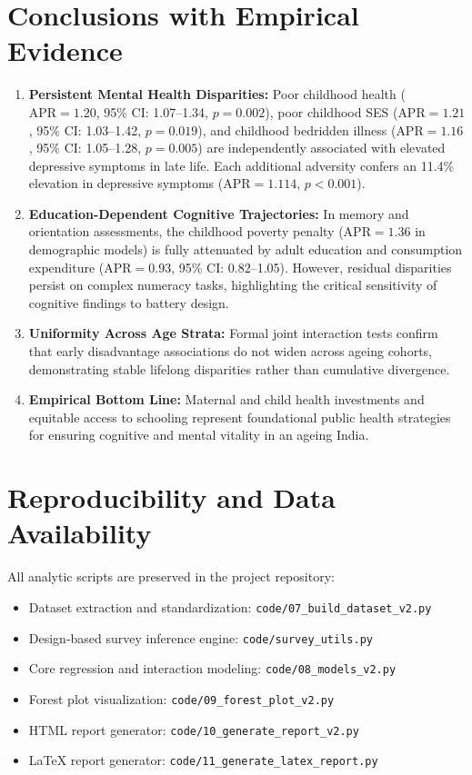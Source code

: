 \documentclass[11pt,a4paper]{article}
\begin{document}
\section{Conclusions with Empirical Evidence}
\begin{enumerate}
    \item \textbf{Persistent Mental Health Disparities:} Poor childhood health ($\text{APR} = 1.20$, 95\% CI: 1.07--1.34, $p = 0.002$), poor childhood SES ($\text{APR} = 1.21$, 95\% CI: 1.03--1.42, $p = 0.019$), and childhood bedridden illness ($\text{APR} = 1.16$, 95\% CI: 1.05--1.28, $p = 0.005$) are independently associated with elevated depressive symptoms in late life. Each additional adversity confers an 11.4\% elevation in depressive symptoms ($\text{APR} = 1.114$, $p < 0.001$).
    \item \textbf{Education-Dependent Cognitive Trajectories:} In memory and orientation assessments, the childhood poverty penalty ($\text{APR} = 1.36$ in demographic models) is fully attenuated by adult education and consumption expenditure ($\text{APR} = 0.93$, 95\% CI: 0.82--1.05). However, residual disparities persist on complex numeracy tasks, highlighting the critical sensitivity of cognitive findings to battery design.
    \item \textbf{Uniformity Across Age Strata:} Formal joint interaction tests confirm that early disadvantage associations do not widen across ageing cohorts, demonstrating stable lifelong disparities rather than cumulative divergence.
    \item \textbf{Empirical Bottom Line:} Maternal and child health investments and equitable access to schooling represent foundational public health strategies for ensuring cognitive and mental vitality in an ageing India.
\end{enumerate}

\section*{Reproducibility and Data Availability}
All analytic scripts are preserved in the project repository:
\begin{itemize}
    \item Dataset extraction and standardization: \texttt{code/07\_build\_dataset\_v2.py}
    \item Design-based survey inference engine: \texttt{code/survey\_utils.py}
    \item Core regression and interaction modeling: \texttt{code/08\_models\_v2.py}
    \item Forest plot visualization: \texttt{code/09\_forest\_plot\_v2.py}
    \item HTML report generator: \texttt{code/10\_generate\_report\_v2.py}
    \item LaTeX report generator: \texttt{code/11\_generate\_latex_report.py}
\end{itemize}
\end{document}

